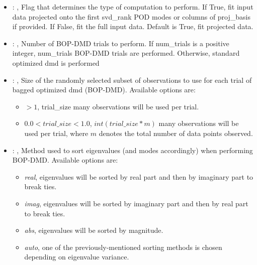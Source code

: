 \begin{itemize}
    \item {}: , 
      Flag that determines the type of computation to perform. If True, fit input
      data projected onto the first svd\_rank POD modes or columns of proj\_basis if provided.
      If False, fit the full input data. Default is True, fit projected data.

    \item {}: , 
      Number of BOP-DMD trials to perform. If num\_trials is a positive integer,
      num\_trials BOP-DMD trials are performed. Otherwise, standard optimized dmd is performed

    \item {}: , 
      Size of the randomly selected subset of observations to use for each trial of bagged optimized
      dmd (BOP-DMD).                                                  Available options are:
      \begin{itemize}                                                    \item \textit{$>1$},
      trial\_size many observations will be used per trial.
      \item $0.0 < trial\_size < 1.0$, $int(trial\_size * m)$ many observations will be used per
      trial,                                                        where $m$ denotes the total
      number of data points observed.                                                  \end{itemize}

    \item {}: , 
      Method used to sort eigenvalues (and modes accordingly) when performing BOP-DMD. Available
      options are:                                                  \begin{itemize}
      \item \textit{real}, eigenvalues will be sorted by real part and then by imaginary part to
      break ties.                                                    \item  \textit{imag},
      eigenvalues will be sorted by imaginary part and then by real part to break ties.
      \item  \textit{abs}, eigenvalues will be sorted by magnitude.
      \item  \textit{auto}, one of the previously-mentioned sorting methods is chosen depending on
      eigenvalue variance.                                                  \end{itemize}


\end{itemize}
